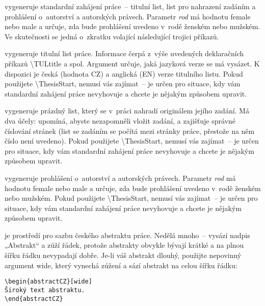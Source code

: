 \documentclass[FM,DP]{tulthesis}
\newcommand{\argument}[1]{{\ttfamily\color{\tulcolor}#1}}
\newcommand{\prikaz}[1]{\argument{\textbackslash #1}}
\newenvironment{myquote}{\begin{list}{}{\setlength\leftmargin\parindent}\item[]}{\end{list}}
\newenvironment{listing}{\begin{myquote}\color{\tulcolor}}{\end{myquote}}
\begin{document}
\begin{description}

\item[\prikaz{ThesisStart\{\emph{rod}\}}] vygeneruje standardní zahájení
práce~-- titulní list, list pro nahrazení zadáním a prohlášení o~autorství a
autorských právech. Parametr \argument{\emph{rod}} má hodnotu
\argument{female} nebo \argument{male} a určuje, zda bude prohlášení uvedeno
v~rodě ženském nebo mužském. Ve skutečnosti se jedná o~zkratku volající
následující trojici příkazů.

\item[\prikaz{ThesisTitle\{\emph{jazyk}\}}] vygeneruje titulní list práce.
Informace čerpá z~výše uvedených deklaračních příkazů \prikaz{TULtitle} a spol.
Argument určuje, jaká jazyková verze se má vysázet. K dispozici je česká
(hodnota \argument{CZ}) a anglická (\argument{EN}) verze titulního listu. Pokud
použijete \prikaz{ThesisStart}, nemusí vás zajímat~-- je určen pro situace, kdy
vám standardní zahájení práce nevyhovuje a chcete je nějakým způsobem upravit.

\item[\prikaz{Assignment}] vygeneruje prázdný list, který se v~práci nahradí
originálem jejího zadání. Má dva účely: upomíná, abyste nezapomněli vložit
zadání, a zajišťuje správné číslování stránek (list se zadáním se počítá mezi
stránky práce, přestože na něm číslo není uvedeno). Pokud použijete
\prikaz{ThesisStart}, nemusí vás zajímat~-- je určen pro situace, kdy vám
standardní zahájení práce nevyhovuje a chcete je nějakým způsobem upravit.

\item[\prikaz{Declaration\{\emph{rod}\}}] vygeneruje prohlášení o~autorství a
autorských právech. Parametr \argument{\emph{rod}} má hodnotu
\argument{female} nebo \argument{male} a určuje, zda bude prohlášení uvedeno
v~rodě ženském nebo mužském. Pokud použijete \prikaz{ThesisStart}, nemusí vás
zajímat~-- je určen pro situace, kdy vám standardní zahájení práce nevyhovuje a
chcete je nějakým způsobem upravit.

\item[\argument{abstractCZ}] je prostředí pro sazbu českého abstraktu práce.
Nedělá mnoho~-- vysází nadpis „Abstrakt“ a zúží řádek, protože abstrakty
obvykle bývají krátké a na plnou šířku řádku nevypadají dobře. Je-li váš
abstrakt dlouhý, použijte nepovinný argument \argument{wide}, který vynechá
zúžení a sází abstrakt na celou šířku řádku:

\begin{listing}
\begin{verbatim}
\begin{abstractCZ}[wide]
Široký text abstraktu.
\end{abstractCZ}
\end{verbatim}
\end{listing}


\end{description}
\end{document}
